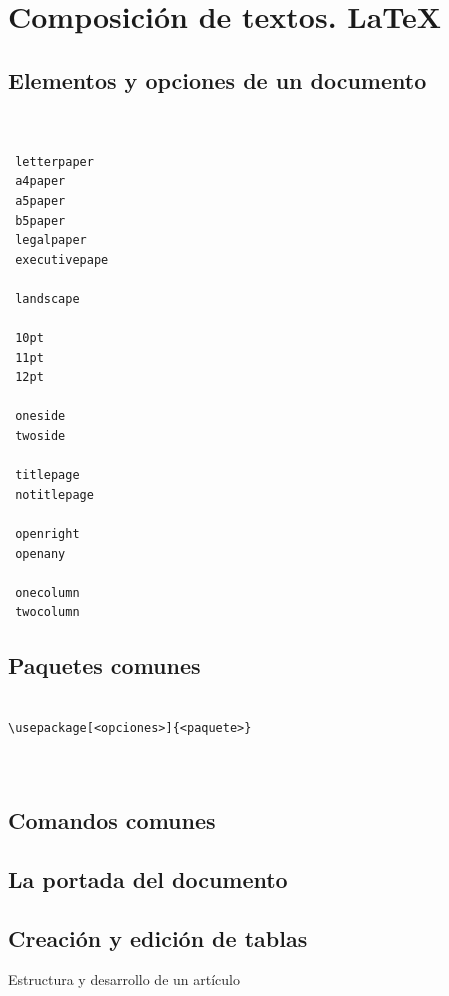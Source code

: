 \documentclass[a4paper, 10pt, titlepage]{report}
\begin{document}
\chapter{Composición de textos. \LaTeX}
\section{Elementos y opciones de un documento}

 \begin{verbatim}   


 letterpaper
 a4paper
 a5paper
 b5paper
 legalpaper
 executivepape

 landscape

 10pt
 11pt
 12pt

 oneside
 twoside

 titlepage
 notitlepage

 openright
 openany
 
 onecolumn
 twocolumn
\end{verbatim}   

\newpage

\section{Paquetes comunes}

\begin{verbatim}

\usepackage[<opciones>]{<paquete>}



\end{verbatim}

\newpage

\section{Comandos comunes}

\newpage

\section{La portada del documento}

\newpage

\section{Creación y edición de tablas}

\newpage

\begin{section}{Estructura y desarrollo de un artículo}\end{section}
\end{document}

